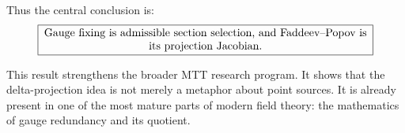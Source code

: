 \documentclass[11pt]{article}
\begin{document}
Thus the central conclusion is:
\[
\boxed{
\begin{minipage}{0.86\textwidth}
\centering
Gauge fixing is admissible section selection, and Faddeev--Popov is its projection Jacobian.
\end{minipage}
}
\]

This result strengthens the broader MTT research program. It shows that the delta-projection idea is not merely a metaphor about point sources. It is already present in one of the most mature parts of modern field theory: the mathematics of gauge redundancy and its quotient.
\end{document}
